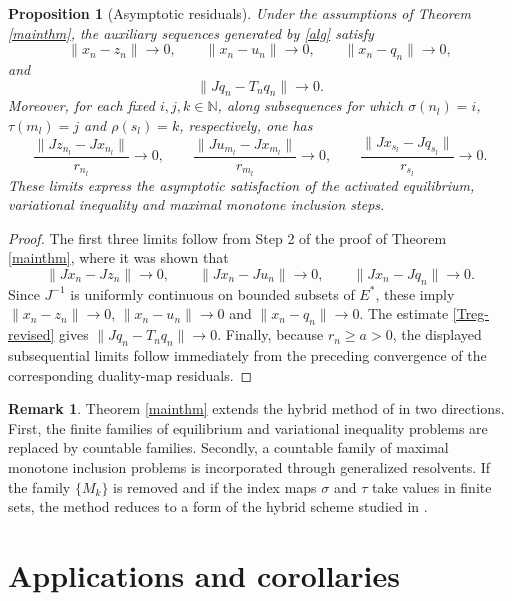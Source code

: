 \documentclass[leqno,12pt]{amsart}
\newtheorem{proposition}[theorem]{Proposition}
\theoremstyle{definition}
\newtheorem{remark}[theorem]{Remark}
\numberwithin{equation}{section}
\begin{document}
\begin{proposition}[Asymptotic residuals]\label{residualprop}
Under the assumptions of Theorem \ref{mainthm}, the auxiliary sequences generated by \eqref{alg} satisfy
\[
\|x_n-z_n\|\to0,\qquad \|x_n-u_n\|\to0,\qquad \|x_n-q_n\|\to0,
\]
and
\[
\|Jq_n-T_nq_n\|\to0.
\]
Moreover, for each fixed $i,j,k\in\mathbb N$, along subsequences for which $\sigma(n_l)=i$, $\tau(m_l)=j$ and $\rho(s_l)=k$, respectively, one has
\[
\frac{\|Jz_{n_l}-Jx_{n_l}\|}{r_{n_l}}\to0,\qquad
\frac{\|Ju_{m_l}-Jx_{m_l}\|}{r_{m_l}}\to0,\qquad
\frac{\|Jx_{s_l}-Jq_{s_l}\|}{r_{s_l}}\to0.
\]
These limits express the asymptotic satisfaction of the activated equilibrium, variational inequality and maximal monotone inclusion steps.
\end{proposition}

\begin{proof}
The first three limits follow from Step 2 of the proof of Theorem \ref{mainthm}, where it was shown that
\[
\|Jx_n-Jz_n\|\to0,\qquad \|Jx_n-Ju_n\|\to0,\qquad \|Jx_n-Jq_n\|\to0.
\]
Since $J^{-1}$ is uniformly continuous on bounded subsets of $E^{*}$, these imply $\|x_n-z_n\|\to0$, $\|x_n-u_n\|\to0$ and $\|x_n-q_n\|\to0$. The estimate \eqref{Treg-revised} gives $\|Jq_n-T_nq_n\|\to0$. Finally, because $r_n\geq a>0$, the displayed subsequential limits follow immediately from the preceding convergence of the corresponding duality-map residuals.
\end{proof}

\begin{remark}
Theorem \ref{mainthm} extends the hybrid method of \cite{UbaCarpathian2023} in two directions. First, the finite families of equilibrium and variational inequality problems are replaced by countable families. Secondly, a countable family of maximal monotone inclusion problems is incorporated through generalized resolvents. If the family $\{M_k\}$ is removed and if the index maps $\sigma$ and $\tau$ take values in finite sets, the method reduces to a form of the hybrid scheme studied in \cite{UbaCarpathian2023}.
\end{remark}

\section{Applications and corollaries}
\end{document}

